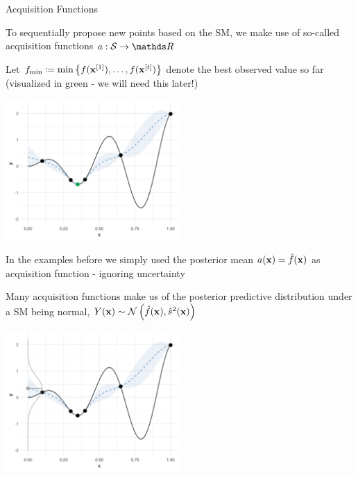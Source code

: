 \documentclass[11pt,compress,t,notes=noshow, xcolor=table]{beamer}
\begin{document}
\begin{vbframe}{Acquisition Functions}

To sequentially propose new points based on the SM, we make use of so-called acquisition functions $a: \mathcal{S} \to \R$\\

\vspace{1em}

Let $f_{\min} \coloneqq \min \left\{f(\mathbf{x}^{[1]}), \ldots, f(\mathbf{x}^{[t]})\right\}$ denote the best observed value so far (visualized in green - we will need this later!)

\vspace*{-0.2cm}

\begin{center}
  \includegraphics[width = 0.5\textwidth]{figure_man/bayesian_loop_sm_fmin.png}
\end{center}

\vspace*{-0.3cm}

In the examples before we simply used the posterior mean $a(\mathbf{x}) = \hat{f}(\mathbf{x})$ as acquisition function - ignoring uncertainty

\framebreak

Many acquisition functions make us of the posterior predictive distribution under a SM being normal, $Y(\mathbf{x}) \sim \mathcal{N}\left(\hat{f}(\mathbf{x}), \hat{s}^2(\mathbf{x})\right)$

\vspace*{-0.2cm}

\begin{center}
  \includegraphics[width = 0.5\textwidth]{figure_man/bayesian_loop_sm_normal.png}
\end{center}


\end{vbframe}
\end{document}
